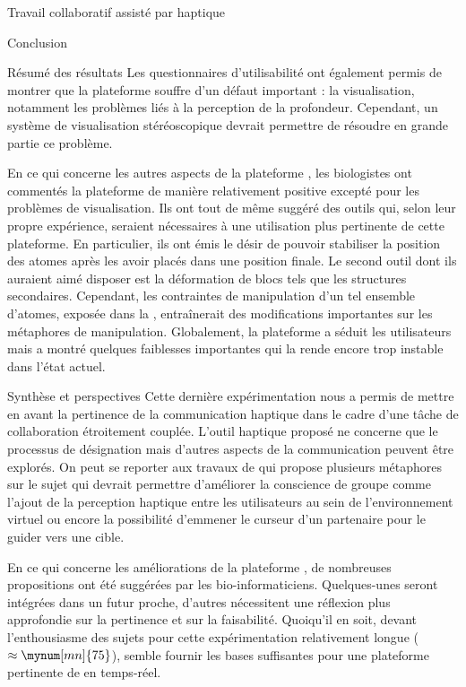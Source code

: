 \documentclass[myfrancais,ngerman,english,french]{mythesis}
\begin{document}
\begin{mychapter}{Travail collaboratif assisté par haptique}
\begin{mysection}{Conclusion}
\begin{mysubsection}{Résumé des résultats}
				Les questionnaires d'utilisabilité ont également permis de montrer que la plateforme souffre d'un défaut important : la visualisation, notamment les problèmes liés à la perception de la profondeur.
				Cependant, un système de visualisation stéréoscopique devrait permettre de résoudre en grande partie ce problème.

				En ce qui concerne les autres aspects de la plateforme \myShaddock, les biologistes ont commentés la plateforme de manière relativement positive excepté pour les problèmes de visualisation.
				Ils ont tout de même suggéré des outils qui, selon leur propre expérience, seraient nécessaires à une utilisation plus pertinente de cette plateforme.
				En particulier, ils ont émis le désir de pouvoir stabiliser la position des atomes après les avoir placés dans une position finale.
				Le second outil dont ils auraient aimé disposer est la déformation de blocs tels que les structures secondaires.
				Cependant, les contraintes de manipulation d'un tel ensemble d'atomes, exposée dans la , entraînerait des modifications importantes sur les métaphores de manipulation.
				Globalement, la plateforme a séduit les utilisateurs mais a montré quelques faiblesses importantes qui la rende encore trop instable dans l'état actuel.
			\end{mysubsection}
			\begin{mysubsection}{Synthèse et perspectives}
				Cette dernière expérimentation nous a permis de mettre en avant la pertinence de la communication haptique dans le cadre d'une tâche de collaboration étroitement couplée.
				L'outil haptique proposé ne concerne que le processus de désignation mais d'autres aspects de la communication peuvent être explorés.
				On peut se reporter aux travaux de  qui propose plusieurs métaphores sur le sujet qui devrait permettre d'améliorer la conscience de groupe comme l'ajout de la perception haptique entre les utilisateurs au sein de l'environnement virtuel ou encore la possibilité d'emmener le curseur d'un partenaire pour le guider vers une cible.

				En ce qui concerne les améliorations de la plateforme \myShaddock, de nombreuses propositions ont été suggérées par les bio-informaticiens.
				Quelques-unes seront intégrées dans un futur proche, d'autres nécessitent une réflexion plus approfondie sur la pertinence et sur la faisabilité.
				Quoiqu'il en soit, devant l'enthousiasme des sujets pour cette expérimentation relativement longue ($\approx \mynum[mn]{75}$), \myShaddock semble fournir les bases suffisantes pour une plateforme pertinente de  en temps-réel.
			\end{mysubsection}
		\end{mysection}
	\end{mychapter}
\end{document}
